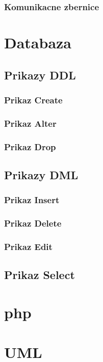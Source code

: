 \subsubsection{Komunikacne zbernice}
\section{Databaza}
\subsection{Prikazy \acl{DDL}}
\subsubsection{Prikaz Create}
\subsubsection{Prikaz Alter}
\subsubsection{Prikaz Drop}
\subsection{Prikazy \acl{DML}}
\subsubsection{Prikaz Insert}
\subsubsection{Prikaz Delete}
\subsubsection{Prikaz Edit}
\subsection{Prikaz Select}

\section{php}
\section{UML}


